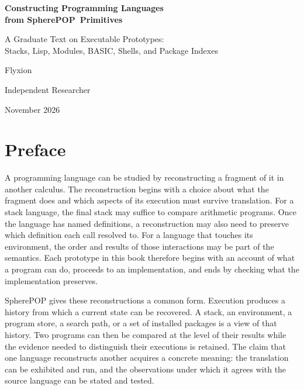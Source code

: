 \documentclass[11pt,oneside]{report}
\newcommand{\SP}{SpherePOP}
\theoremstyle{plain}
\theoremstyle{definition}
\theoremstyle{remark}
\begin{document}
\begin{titlepage}
\centering
\vspace*{2.2cm}
{\LARGE\bfseries Constructing Programming Languages\\[0.4em] from \SP\ Primitives\par}
\vspace{0.9cm}
{\Large A Graduate Text on Executable Prototypes:\\[0.3em] Stacks, Lisp, Modules, BASIC, Shells, and Package Indexes\par}
\vspace{2.2cm}
{\large Flyxion\par}
{\normalsize Independent Researcher\par}
\vspace{1.2cm}
{\normalsize November 2026\par}
\vfill
\end{titlepage}
\tableofcontents
\clearpage
{}
\chapter*{Preface}

A programming language can be studied by reconstructing a fragment of it in another calculus. The reconstruction begins with a choice about what the fragment does and which aspects of its execution must survive translation. For a stack language, the final stack may suffice to compare arithmetic programs. Once the language has named definitions, a reconstruction may also need to preserve which definition each call resolved to. For a language that touches its environment, the order and results of those interactions may be part of the semantics. Each prototype in this book therefore begins with an account of what a program can do, proceeds to an implementation, and ends by checking what the implementation preserves.

\SP{} gives these reconstructions a common form. Execution produces a history from which a current state can be recovered. A stack, an environment, a program store, a search path, or a set of installed packages is a view of that history. Two programs can then be compared at the level of their results while the evidence needed to distinguish their executions is retained. The claim that one language reconstructs another acquires a concrete meaning: the translation can be exhibited and run, and the observations under which it agrees with the source language can be stated and tested.
\end{document}
